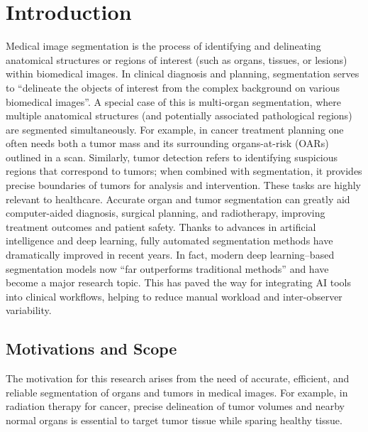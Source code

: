 \documentclass{cls/iutbscthesis}
\begin{document}
\chapter{Introduction}
Medical image segmentation is the process of identifying and delineating anatomical structures or regions of interest (such as organs, tissues, or lesions) within biomedical images. In clinical diagnosis and planning, segmentation serves to “delineate the objects of interest from the complex background on various biomedical images”\cite{chen2024transattunet}. A special case of this is multi-organ segmentation, where multiple anatomical structures (and potentially associated pathological regions) are segmented simultaneously. For example, in cancer treatment planning one often needs both a tumor mass and its surrounding organs-at-risk (OARs) outlined in a scan\cite{liu2024multiorgan}. Similarly, tumor detection refers to identifying suspicious regions that correspond to tumors; when combined with segmentation, it provides precise boundaries of tumors for analysis and intervention. These tasks are highly relevant to healthcare. Accurate organ and tumor segmentation can greatly aid computer-aided diagnosis, surgical planning, and radiotherapy, improving treatment outcomes and patient safety\cite{liu2024multiorgan}. Thanks to advances in artificial intelligence and deep learning, fully automated segmentation methods have dramatically improved in recent years. In fact, modern deep learning–based segmentation models now “far outperforms traditional methods” and have become a major research topic\cite{liu2024multiorgan}. This has paved the way for integrating AI tools into clinical workflows, helping to reduce manual workload and inter-observer variability.

\section{Motivations and Scope}
The motivation for this research arises from the need of accurate, efficient, and reliable segmentation of organs and tumors in medical images. For example, in radiation therapy for cancer, precise delineation of tumor volumes and nearby normal organs is essential to target tumor tissue while sparing healthy tissue.\\
\end{document}
